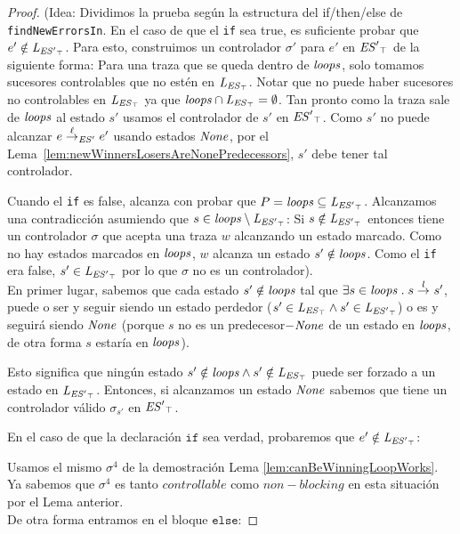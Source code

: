 \begin{proof}
	(Idea: Dividimos la prueba según la estructura del  if/then/else de \texttt{findNewErrorsIn}. 
	En el caso de que el \texttt{if} sea true, es suficiente probar que $e' \notin \mathit{L_{\mathit{{\mathit{ES}'}_{\top}}}}$. Para esto, 
	construimos un controlador $\sigma'$ para $e'$ en $\mathit{{\mathit{ES}'}_{\top}}$ de la siguiente forma: Para una traza que se queda dentro de $\mathit{loops}$, solo tomamos sucesores controlables que no estén en $\mathit{L_{\mathit{{\mathit{ES}}_{\top}}}}$. Notar que no puede haber sucesores no controlables en $\mathit{L_{\mathit{{\mathit{ES}}_{\top}}}}$ ya que
	$\mathit{loops} \cap \mathit{L_{\mathit{{\mathit{ES}}_{\top}}}}= \emptyset$. Tan pronto como la traza sale de $\mathit{loops}$ al estado $s'$ usamos el controlador de $s'$ en $\mathit{{\mathit{ES}'}_{\top}}$. 
	Como $s'$ no puede alcanzar $e \overset{\ell}{\rightarrow}_{\mathit{ES}'} 
	e'$ usando estados $\mathit{None}$, por el 
	Lema~\ref{lem:newWinnersLosersAreNonePredecessors}, $s'$ debe tener tal controlador. 
	
	Cuando el \texttt{if} es false, alcanza con probar que $P = \mathit{loops} \subseteq \mathit{L_{\mathit{{\mathit{ES}'}_{\top}}}}$. Alcanzamos una contradicción asumiendo que $s \in \mathit{loops} \setminus \mathit{L_{\mathit{{\mathit{ES}'}_{\top}}}}$: Si $s 
	\notin \mathit{L_{\mathit{{\mathit{ES}'}_{\top}}}}$ entonces tiene un controlador $\sigma$ que acepta una traza $w$ alcanzando un estado marcado. Como no hay estados marcados en $\mathit{loops}$, $w$ alcanza un estado $s' \notin \mathit{loops}$. Como el
	\texttt{if} era false, $s' \in \mathit{L_{\mathit{{\mathit{ES}'}_{\top}}}}$ por lo que $\sigma$ no es un controlador).\\
	


En primer lugar, sabemos que cada estado $s' \notin \mathit{loops}$ tal que $\exists s \in \mathit{loops} \;.\; s 
\overset{l}{\rightarrow}_{} s'$, puede o ser y seguir siendo un estado perdedor ($s' \in \mathit{L_{\mathit{{\mathit{ES}}_{\top}}}} \wedge s' \in \mathit{L_{\mathit{{\mathit{ES}'}_{\top}}}}$) o es y seguirá siendo $\mathit{None}$ (porque $s$ no es un predecesor$-\mathit{None}$ de un estado en $\mathit{loops}$, de otra forma $s$ estaría en $\mathit{loops}$). 

Esto significa que ningún estado $s' \notin \mathit{loops} \wedge s' \notin \mathit{L_{\mathit{{\mathit{ES}}_{\top}}}}$ puede ser forzado a un estado en $\mathit{L_{\mathit{{\mathit{ES}'}_{\top}}}}$. Entonces, si alcanzamos un estado $\mathit{None}$ sabemos que tiene un controlador válido $\sigma_{s'}$ en $\mathit{{\mathit{ES}'}_{\top}}$.

En el caso de que la declaración $\texttt{if}$ sea verdad, probaremos que $e' \notin \mathit{L_{\mathit{{\mathit{ES}'}_{\top}}}}$:

Usamos el mismo $\sigma^4$ de la demostración Lema \ref{lem:canBeWinningLoopWorks}. Ya sabemos que $\sigma^4$ es tanto $controllable$ como $non-blocking$ en esta situación por el Lema anterior.\\

De otra forma entramos en el bloque $\texttt{else}$:


\end{proof}
